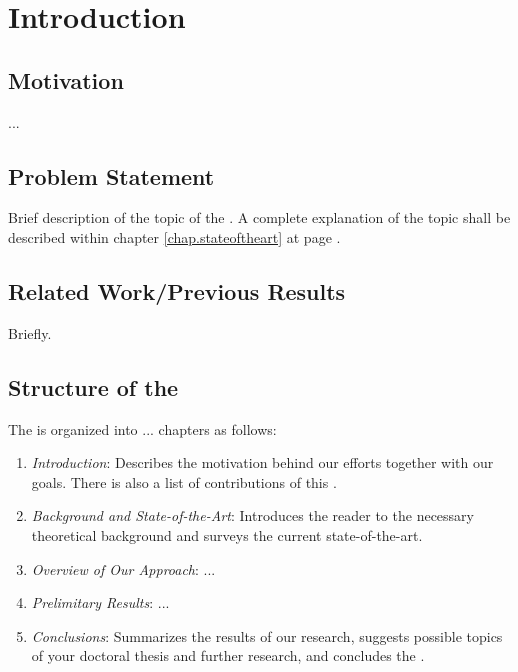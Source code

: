 \chapter{Introduction}
\enlargethispage*{5pt}

\section{Motivation}
...

\section{Problem Statement}
Brief description of the topic of the \thesis. A complete explanation of the topic shall be described within chapter \ref{chap.stateoftheart} at page \pageref{chap.stateoftheart}.

\section{Related Work/Previous Results}
Briefly.

\section{Structure of the \Thesis{}}
The \thesis{} is organized into ... chapters as follows:
\begin{enumerate}
\item \emph{Introduction}: Describes the motivation behind our efforts together with our goals. There is also a list of contributions of this \thesis. 

\item \emph{Background and State-of-the-Art}: Introduces the reader to the necessary theoretical background and surveys the current state-of-the-art.

\item \emph{Overview of Our Approach}: ...

\item \emph{Prelimitary Results}: ...

\item \emph{Conclusions}: Summarizes the results of our research, suggests possible topics of your doctoral thesis and further research, and concludes the \thesis.
\end{enumerate}
